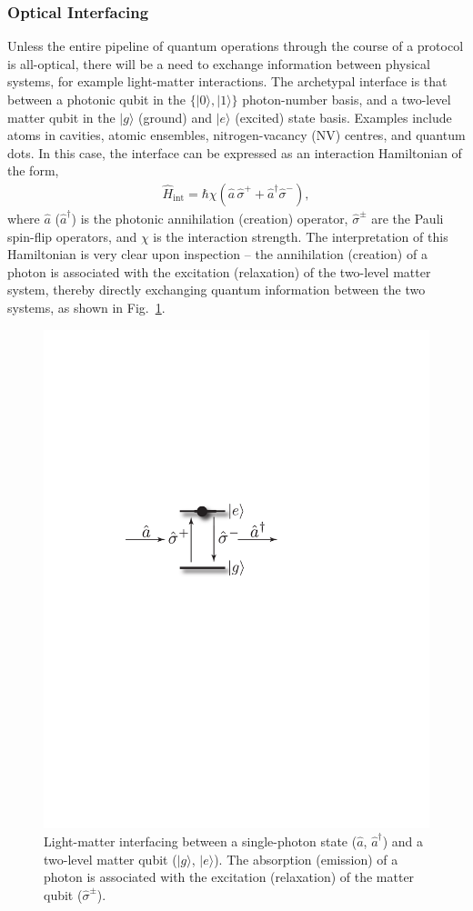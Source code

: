 \documentclass[aps,rmp,twocolumn,amsmath,amssymb,nofootinbib,superscriptaddress]{revtex4}
\newcommand{\ket}[1]{|#1\rangle}
\begin{document}
%
%

\subsubsection{Optical Interfacing} \label{sec:opt_inter}

Unless the entire pipeline of quantum operations through the course of a protocol is all-optical, there will be a need to exchange information between physical systems, for example light-matter interactions. The archetypal interface is that between a photonic qubit in the \mbox{$\{\ket{0},\ket{1}\}$} photon-number basis, and a two-level matter qubit in the $\ket{g}$ (ground) and $\ket{e}$ (excited) state basis. Examples include atoms in cavities, atomic ensembles, nitrogen-vacancy (NV) centres, and quantum dots. In this case, the interface can be expressed as an interaction Hamiltonian of the form,
\begin{align}
\hat{H}_\mathrm{int} = \hbar \chi (\hat{a}\,\hat\sigma^+ + \hat{a}^\dag\hat\sigma^-),
\end{align}
where $\hat{a}$ ($\hat{a}^\dag$) is the photonic annihilation (creation) operator, $\hat\sigma^\pm$ are the Pauli spin-flip operators, and $\chi$ is the interaction strength. The interpretation of this Hamiltonian is very clear upon inspection -- the annihilation (creation) of a photon is associated with the excitation (relaxation) of the two-level matter system, thereby directly exchanging quantum information between the two systems, as shown in Fig.~\ref{fig:opt_int}.

\begin{figure}[!htb]
\includegraphics[width=0.6\columnwidth]{opt_inter}
\caption{Light-matter interfacing between a single-photon state ($\hat{a}$, $\hat{a}^\dag$) and a two-level matter qubit ($\ket{g}$, $\ket{e}$). The absorption (emission) of a photon is associated with the excitation (relaxation) of the matter qubit ($\hat\sigma^\pm$).} \label{fig:opt_int}
\end{figure}
\end{document}
